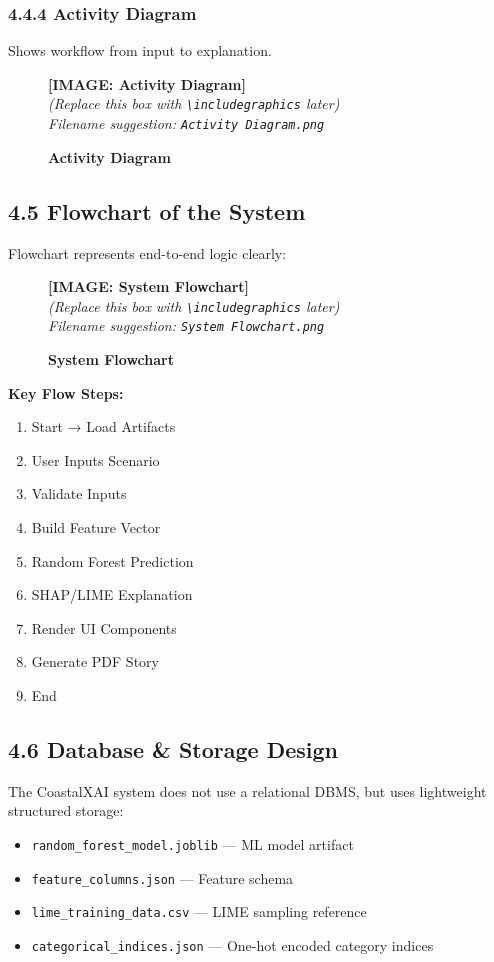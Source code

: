 \documentclass[12pt, a4paper]{article}
\newcommand{\imageplaceholder}[2]{
  \begin{figure}[H]
    \centering
    \begin{tcolorbox}[colback=white, colframe=black, width=0.8\textwidth, arc=0mm, boxrule=1pt]
      \centering
      \vspace{#2}
      \textbf{\Large [IMAGE: #1]}\\
      \vspace{0.5cm}
      \textit{(Replace this box with \texttt{\textbackslash includegraphics} later)}\\
      \textit{Filename suggestion: \texttt{#1.png}}
      \vspace{#2}
    \end{tcolorbox}
    \caption{\textbf{#1}}
    \label{fig:#1}
  \end{figure}
}
\begin{document}
\subsubsection{\textbf{4.4.4 Activity Diagram}}

Shows workflow from input to explanation.

\imageplaceholder{Activity Diagram}{6cm}

\subsection{\textbf{4.5 Flowchart of the System}}

Flowchart represents end-to-end logic clearly:

\imageplaceholder{System Flowchart}{6cm}

\noindent
\textbf{Key Flow Steps:}

\begin{enumerate}
    \item Start → Load Artifacts
    \item User Inputs Scenario
    \item Validate Inputs
    \item Build Feature Vector
    \item Random Forest Prediction
    \item SHAP/LIME Explanation
    \item Render UI Components
    \item Generate PDF Story
    \item End
\end{enumerate}

\subsection{\textbf{4.6 Database & Storage Design}}

The CoastalXAI system does not use a relational DBMS, but uses lightweight structured storage:

\begin{itemize}
    \item \texttt{random\_forest\_model.joblib} — ML model artifact
    \item \texttt{feature\_columns.json} — Feature schema
    \item \texttt{lime\_training\_data.csv} — LIME sampling reference
    \item \texttt{categorical\_indices.json} — One-hot encoded category indices
\end{itemize}
\end{document}
